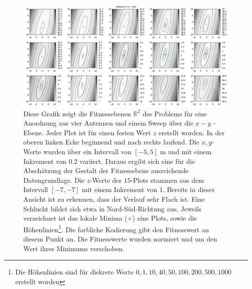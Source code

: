 %
\begin{figure}[h!]
  \caption[Fitness Ebenen Heatmap]{Diese Grafik zeigt die Fitnessebenen $\mathbb{R}^{2}$ des Problems für eine Anordnung aus vier Antennen und einem Sweep über die $x-y$ - Ebene. Jeder Plot ist für einen festen Wert $z$ erstellt worden. In der oberen linken Ecke beginnend und nach rechts laufend. Die $x, y$-Werte wurden über ein Intervall von $[-5,5]$ m und mit einem Inkrement von $0.2$ variiert. Daraus ergibt sich eine für die Abschätzung der Gestalt der Fitnessebene ausreichende Datengrundlage. Die $z$-Werte der $15$-Plots stammen aus dem Intervall $[-7,-7]$ mit einem Inkrement von $1$. Bereits in dieser Ansicht ist zu erkennen, dass der Verlauf sehr Flach ist. Eine Schlucht bildet sich etwa in Nord-Süd-Richtung aus. Jeweils verzeichnet ist das lokale Minima ($+$) eins Plots, sowie die Höhenlinien\footnote{Die Höhenlinien sind für diskrete Werte ${0,1,10,40,50,100,200,500,1000}$ erstellt worden}. Die farbliche Kodierung gibt den Fitnesswert an diesem Punkt an. Die Fitnesswerte wurden normiert und um den Wert ihres Minimums verschoben.}
  \begin{center}
    \includegraphics[width=\textwidth]{img/fitness/xy_a0.png}
  \end{center}
  \label{fig:fitnessplane1-x-y-1}
%
\end{figure}

